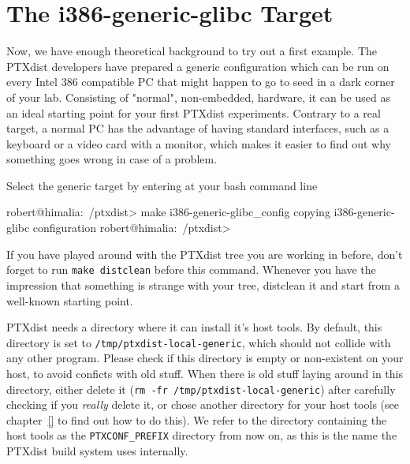 \chapter{The i386-generic-glibc Target}		\label{chap:i386-generic}

Now, we have enough theoretical background to try out a first example.
The PTXdist developers have prepared a generic configuration which can
be run on every Intel 386 compatible PC that might happen to go to seed
in a dark corner of your lab. Consisting of "normal", non-embedded,
hardware, it can be used as an ideal starting point for your first
PTXdist experiments. Contrary to a real target, a normal PC has the
advantage of having standard interfaces, such as a keyboard or a video
card with a monitor, which makes it easier to find out why something
goes wrong in case of a problem. 

Select the generic target by entering at your bash command line

\begin{code}
robert@himalia:~/ptxdist> make i386-generic-glibc_config
copying i386-generic-glibc configuration
robert@himalia:~/ptxdist>
\end{code}

\begin{important}
If you have played around with the PTXdist tree you are working in
before, don't forget to run \texttt{make distclean} before this command.
Whenever you have the impression that something is strange with
your tree, distclean it and start from a well-known starting
point. 
\end{important}

PTXdist needs a directory where it can install it's host tools. By
default, this directory is set to \texttt{/tmp/ptxdist-local-generic},
which should not collide with any other program. Please check if this
directory is empty or non-existent on your host, to avoid conficts with
old stuff. When there is old stuff laying around in this directory,
either delete it (\texttt{rm -fr /tmp/ptxdist-local-generic}) after
carefully checking if you \emph{really} delete it, or chose another
directory for your host tools (see chapter~\ref{} to find out how to do
this). We refer to the directory containing the host tools as the
\texttt{PTXCONF\_PREFIX} directory from now on, as this is the name the
PTXdist build system uses internally. 

